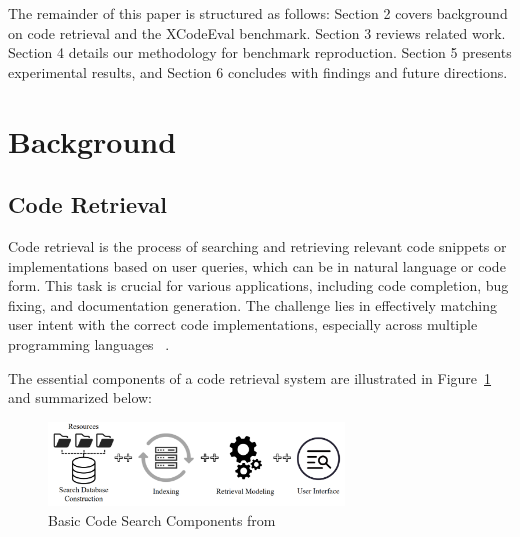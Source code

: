 \documentclass[12pt]{article}
\begin{document}
The remainder of this paper is structured as follows:
Section 2 covers background on code retrieval and the XCodeEval benchmark.
Section 3 reviews related work.
Section 4 details our methodology for benchmark reproduction.
Section 5 presents experimental results, and
Section 6 concludes with findings and future directions.

\section{Background}




\subsection{Code Retrieval}

Code retrieval is the process of searching and retrieving relevant code snippets or implementations based on user queries, which can be in natural language or code form. This task is crucial for various applications, including code completion, bug fixing, and documentation generation. The challenge lies in effectively matching user intent with the correct code implementations, especially across multiple programming languages ~\cite{Kim2021}.

The essential components of a code retrieval system are illustrated in Figure~\ref{fig:code-search-components} and summarized below:

\begin{figure}[ht]
\centering
\includegraphics[width=0.7\textwidth]{images/code-search-components.png}
\caption{Basic Code Search Components from \cite{Kim2021}}
\label{fig:code-search-components}
\end{figure}
\end{document}
